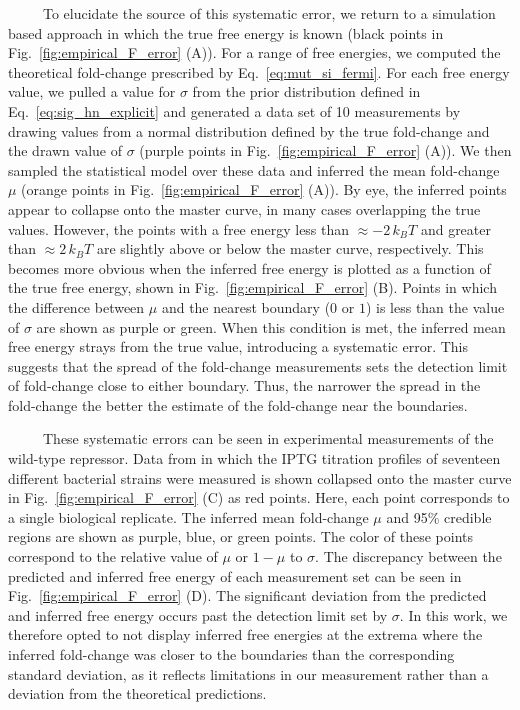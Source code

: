 \documentclass[12pt]{caltech_thesis}
\begin{document}
~~~~~To elucidate the source of this systematic error, we return to a
simulation based approach in which the true free energy is known (black
points in Fig.~\ref{fig:empirical_F_error} (A)). For a range of free
energies, we computed the theoretical fold-change prescribed by
Eq.~\ref{eq:mut_si_fermi}. For each free energy value, we pulled a value
for \(\sigma\) from the prior distribution defined in
Eq.~\ref{eq:sig_hn_explicit} and generated a data set of 10 measurements
by drawing values from a normal distribution defined by the true
fold-change and the drawn value of \(\sigma\) (purple points in
Fig.~\ref{fig:empirical_F_error} (A)). We then sampled the statistical
model over these data and inferred the mean fold-change \(\mu\) (orange
points in Fig.~\ref{fig:empirical_F_error} (A)). By eye, the inferred
points appear to collapse onto the master curve, in many cases
overlapping the true values. However, the points with a free energy less
than \(\approx-2\, k_BT\) and greater than \(\approx 2\, k_BT\) are
slightly above or below the master curve, respectively. This becomes
more obvious when the inferred free energy is plotted as a function of
the true free energy, shown in Fig.~\ref{fig:empirical_F_error} (B).
Points in which the difference between \(\mu\) and the nearest boundary
(\(0\) or \(1\)) is less than the value of \(\sigma\) are shown as
purple or green. When this condition is met, the inferred mean free
energy strays from the true value, introducing a systematic error. This
suggests that the spread of the fold-change measurements sets the
detection limit of fold-change close to either boundary. Thus, the
narrower the spread in the fold-change the better the estimate of the
fold-change near the boundaries.

~~~~~These systematic errors can be seen in experimental measurements of
the wild-type repressor. Data from \textcite{razo-mejia2018} in which
the IPTG titration profiles of seventeen different bacterial strains
were measured is shown collapsed onto the master curve in
Fig.~\ref{fig:empirical_F_error} (C) as red points. Here, each point
corresponds to a single biological replicate. The inferred mean
fold-change \(\mu\) and 95\% credible regions are shown as purple, blue,
or green points. The color of these points correspond to the relative
value of \(\mu\) or \(1 - \mu\) to \(\sigma\). The discrepancy between
the predicted and inferred free energy of each measurement set can be
seen in Fig.~\ref{fig:empirical_F_error} (D). The significant deviation
from the predicted and inferred free energy occurs past the detection
limit set by \(\sigma\). In this work, we therefore opted to not display
inferred free energies at the extrema where the inferred fold-change was
closer to the boundaries than the corresponding standard deviation, as
it reflects limitations in our measurement rather than a deviation from
the theoretical predictions.
\end{document}
